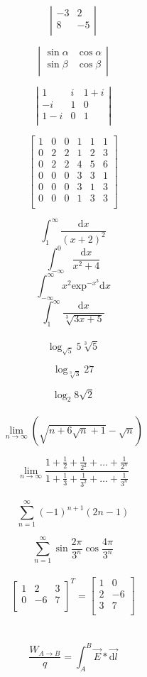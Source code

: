 \documentclass[12pt, letterpaper, titlepage]{article}
\begin{document}
$$
\left|\begin{array}{rr}
-3&2\\
8&-5\\
\end{array} \right|
$$

$$
\left|\begin{array}{rr}
\sin{\alpha}&\cos{\alpha}\\
\sin{\beta}&\cos{\beta}\\
\end{array} \right|
$$

$$
\left|\begin{array}{ccc}
1&i&1+i\\
-i&1&0\\
1-i&0&1\\
\end{array} \right|
$$

$$
\left[\begin{array}{cccccc}
1&0&0&1&1&1\\
0&2&2&1&2&3\\
0&2&2&4&5&6\\
0&0&0&3&3&1\\
0&0&0&3&1&3\\
0&0&0&1&3&3\\
\end{array} \right]$$



$$ \int_{1}^{\infty}\frac{\mathrm{d} x}{(x+2)^2}$$
$$ \int_{-\infty}^{0}\frac{\mathrm{d} x}{x^{2}+4}$$
$$\int_{-\infty}^{\infty}x^2\mathrm{exp}^{-x^3}\mathrm{d}x$$
$$\int_{1}^{\infty}\frac{\mathrm{d}x}{\sqrt[3]{3x+5}}$$
\\
$$\log_{\sqrt{5}}5\sqrt[3]{5}$$

$$\log_{\sqrt[3]{3}}27$$

$$\log_2{8}\sqrt{2}$$
\\
 $$\lim_{n\to\infty}\left(\sqrt{n+6\sqrt{n}+1}-\sqrt{n}\right)$$
 
$$\lim_{n\to\infty}\frac{1+\frac{1}{2}+\frac{1}{2^2}+\dots+\frac{1}{2^n}}{1+\frac{1}{3}+\frac{1}{3^2}+\dots+\frac{1}{3^n}}$$ 
\\
$$\sum_{n=1}^{\infty}(-1)^{n+1}(2n-1)$$

$$\sum_{n=1}^{\infty}\sin{\frac{2\pi}{3^n}}\cos{\frac{4\pi}{3^n}}$$
\\
$$
\left[\begin{array}{clc}
1&2&3\\
0&-6&7\\
\end{array}\right]^T
=
\left[\begin{array}{cl}
1&0\\
2&-6\\
3&7\\
\end{array}\right]
$$
\\
\\
$$
\frac{W_{A\rightarrow B}} {q} = \int_A^B \vec{E}*\vec{\mathrm{d}l}
$$


 
\end{document}
